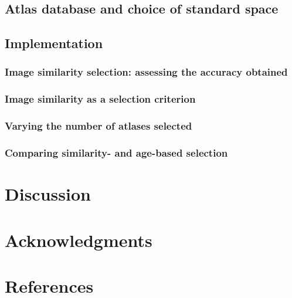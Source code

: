 \subsection*{Atlas database and choice of standard space}
\subsection*{Implementation}
\subsubsection*{Image similarity selection: assessing the accuracy obtained}
\subsubsection*{Image similarity as a selection criterion}
\subsubsection*{Varying the number of atlases selected}
\subsubsection*{Comparing similarity- and age-based selection}
\section*{Discussion}
\section*{Acknowledgments}
\section*{References}
